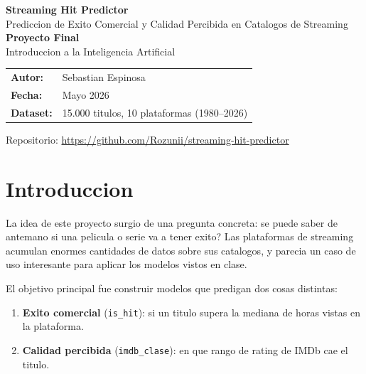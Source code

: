 \documentclass[12pt, a4paper]{article}
\begin{document}
\sloppy
\begin{titlepage}
\centering\vspace{2cm}
{\LARGE\bfseries\color{azul} Streaming Hit Predictor}\\[0.5cm]
{\large Prediccion de Exito Comercial y Calidad Percibida en Catalogos de Streaming}\\[2cm]
{\large\textbf{Proyecto Final}}\\[0.5cm]
{\large Introduccion a la Inteligencia Artificial}\\[2cm]
\begin{tabular}{ll}
\textbf{Autor:} & Sebastian Espinosa \\[0.3cm]
\textbf{Fecha:} & Mayo 2026 \\[0.3cm]
\textbf{Dataset:} & 15.000 titulos, 10 plataformas (1980--2026)
\end{tabular}
\vfill
{\small Repositorio: \url{https://github.com/Rozunii/streaming-hit-predictor}}
\end{titlepage}
\begin{abstract}
Este proyecto aplica cuatro algoritmos de machine learning sobre un dataset de 15.000 titulos de plataformas de streaming para responder dos preguntas: que hace que un contenido sea un exito comercial, y si se puede predecir como lo va a calificar el publico. Los modelos supervisados (Arbol de Decision y SVM) predicen si un titulo supera la mediana de horas vistas, alcanzando mas del 91\% de accuracy. La Red Neuronal (implementada con TensorFlow) clasifica la calidad percibida en tres categorias, alcanzando F1-macro de 0.68 gracias a class weights balanceados y la inclusion de Rotten Tomatoes como feature adicional. El clustering con K-Means agrupa los titulos en cuatro perfiles.
\end{abstract}


\section{Introduccion}

La idea de este proyecto surgio de una pregunta concreta: se puede saber de antemano si una pelicula o serie va a tener exito? Las plataformas de streaming acumulan enormes cantidades de datos sobre sus catalogos, y parecia un caso de uso interesante para aplicar los modelos vistos en clase.

El objetivo principal fue construir modelos que predigan dos cosas distintas:
\begin{enumerate}
\item \textbf{Exito comercial} (\texttt{is\_hit}): si un titulo supera la mediana de horas vistas en la plataforma.
\item \textbf{Calidad percibida} (\texttt{imdb\_clase}): en que rango de rating de IMDb cae el titulo.
\end{enumerate}
\end{document}
